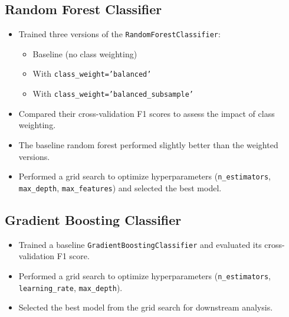 \documentclass[12pt]{article}
\begin{document}
\subsection{Random Forest Classifier}
\begin{itemize}
    \item Trained three versions of the \texttt{RandomForestClassifier}:
    \begin{itemize}
        \item Baseline (no class weighting)
        \item With \texttt{class\_weight='balanced'}
        \item With \texttt{class\_weight='balanced\_subsample'}
    \end{itemize}
    \item Compared their cross-validation F1 scores to assess the impact of class weighting.
    \item The baseline random forest performed slightly better than the weighted versions.
    \item Performed a grid search to optimize hyperparameters (\texttt{n\_estimators}, \texttt{max\_depth}, \texttt{max\_features}) and selected the best model.
\end{itemize}

\subsection{Gradient Boosting Classifier}
\begin{itemize}
    \item Trained a baseline \texttt{GradientBoostingClassifier} and evaluated its cross-validation F1 score.
    \item Performed a grid search to optimize hyperparameters (\texttt{n\_estimators}, \texttt{learning\_rate}, \texttt{max\_depth}).
    \item Selected the best model from the grid search for downstream analysis.
\end{itemize}
\end{document}
